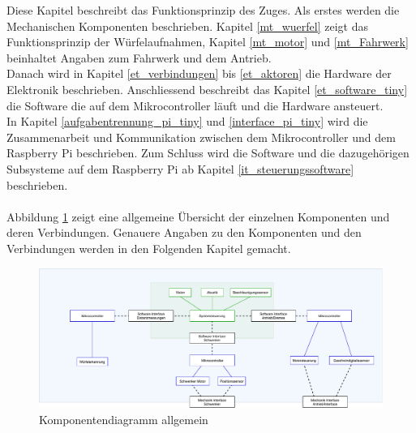 \documentclass[../../main.tex]{subfiles}
\begin{document}

Diese Kapitel beschreibt das Funktionsprinzip des Zuges. Als erstes werden die Mechanischen Komponenten beschrieben. Kapitel \ref{mt_wuerfel} zeigt das Funktionsprinzip der Würfelaufnahmen, Kapitel \ref{mt_motor} und \ref{mt_Fahrwerk} beinhaltet Angaben zum Fahrwerk und dem Antrieb. \\
Danach wird in Kapitel \ref{et_verbindungen} bis \ref{et_aktoren} die Hardware der Elektronik beschrieben. Anschliessend beschreibt das Kapitel \ref{et_software_tiny} die Software die auf dem Mikrocontroller läuft und die Hardware ansteuert. \\
In Kapitel \ref{aufgabentrennung_pi_tiny} und \ref{interface_pi_tiny} wird die Zusammenarbeit und Kommunikation zwischen dem Mikrocontroller und dem Raspberry Pi beschrieben.
Zum Schluss wird die Software und die dazugehörigen Subsysteme auf dem Raspberry Pi ab Kapitel \ref{it_steuerungssoftware} beschrieben.\\
\\
Abbildung \ref{fig:komponenten_allg} zeigt eine allgemeine Übersicht der einzelnen Komponenten und deren Verbindungen. Genauere Angaben zu den Komponenten und den Verbindungen werden in den Folgenden Kapitel gemacht.\\

\begin{figure}[H]
    \centering
    \includegraphics[width=1.0\textwidth]{../../images/Komponentendiagramm/Komponentendiagramm.pdf}
    \caption {Komponentendiagramm allgemein}
    \label{fig:komponenten_allg}
\end{figure}
\end{document}
